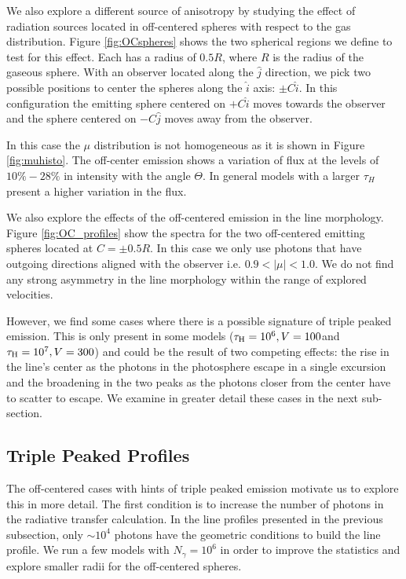 \documentclass{emulateapj}
\newcommand{\kms}{{\ifmmode{{\mathrm{\,km\ s}^{-1}}}\else{\,km~s$^{-1}$}\fi}}
\begin{document}
We also explore a different source of anisotropy by studying the effect
of radiation sources located in off-centered spheres with respect to
the gas distribution. Figure \ref{fig:OCspheres} shows the two
spherical regions we define to test for this effect. Each has a radius
of $0.5R$, where $R$ is the radius of the gaseous sphere. With an
observer located along the $\hat{j}$ direction, we pick two possible
positions to center the spheres along the $\hat{i}$ axis: $\pm C\hat{i}$. In
this configuration the emitting sphere centered on $+C\hat{i}$ moves
towards the observer and the sphere centered on $-C\hat{j}$ moves
away from the observer. 


In this case the $\mu$ distribution is not homogeneous as it is shown in
Figure \ref{fig:muhisto}. The off-center emission shows a variation of flux at
the levels of $10\% - 28\%$ in intensity with the angle $\Theta$. In general 
models with a larger $\tau_{H}$ present a higher variation in the flux.


We also explore the effects of the off-centered emission in the line
morphology. Figure \ref{fig:OC_profiles} show the spectra for the two
off-centered emitting spheres located at $C=\pm0.5R$.  In this case we
only use photons that have outgoing directions aligned with the
observer i.e. $0.9 <\vert \mu \vert < 1.0$. We do not find any strong
asymmetry in the line morphology within the range of explored velocities.


However, we find some cases where there is a possible signature of
triple peaked emission. This is only present in some models
($\tau_{\rm H} = 10^6, V=100$\kms and $\tau_{\rm H} = 10^7,
V=300$\kms) and could be the result of two competing effects: the rise
in the line's center as the photons in the photosphere escape in a
single excursion and the broadening in the two peaks as the photons
closer from the center have to scatter to escape. We examine in
greater detail these cases in the next sub-section. 



\subsection{Triple Peaked Profiles}
\label{sec:3p}

The off-centered cases with hints of triple peaked emission motivate us
to explore this in more detail. The first condition is to increase the
number of photons in the radiative transfer calculation. In the line
profiles presented in the previous subsection, only $\sim 10^4$ photons
have the geometric conditions to build the line profile. We run a few
models with $N_{\gamma} = 10^6$ in order to improve the statistics and
explore smaller radii for the off-centered spheres.
\end{document}
